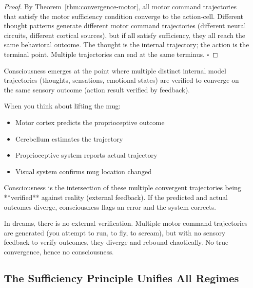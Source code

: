 \begin{proof}
By Theorem~\ref{thm:convergence-motor}, all motor command trajectories that satisfy the motor sufficiency condition converge to the action-cell. Different thought patterns generate different motor command trajectories (different neural circuits, different cortical sources), but if all satisfy sufficiency, they all reach the same behavioral outcome. The thought is the internal trajectory; the action is the terminal point. Multiple trajectories can end at the same terminus. $\square$
\end{proof}

\begin{corollary}
\label{cor:consciousness-convergence}
Consciousness emerges at the point where multiple distinct internal model trajectories (thoughts, sensations, emotional states) are verified to converge on the same sensory outcome (action result verified by feedback).

When you think about lifting the mug:
\begin{itemize}
    \item Motor cortex predicts the proprioceptive outcome
    \item Cerebellum estimates the trajectory
    \item Proprioceptive system reports actual trajectory
    \item Visual system confirms mug location changed
\end{itemize}

Consciousness is the intersection of these multiple convergent trajectories being **verified** against reality (external feedback). If the predicted and actual outcomes diverge, consciousness flags an error and the system corrects.

In dreams, there is no external verification. Multiple motor command trajectories are generated (you attempt to run, to fly, to scream), but with no sensory feedback to verify outcomes, they diverge and rebound chaotically. No true convergence, hence no consciousness.
\end{corollary}

\subsection{The Sufficiency Principle Unifies All Regimes}
\label{subsec:sufficiency-unification}

